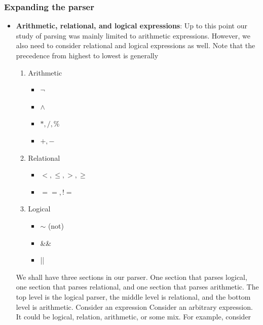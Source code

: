 \documentclass{report}
\begin{document}
    \subsubsection{Expanding the parser}
    \begin{itemize}
        \item \textbf{Arithmetic, relational, and logical expressions}: Up to this point our study of parsing was mainly limited to arithmetic expressions. However, we also need to consider relational and logical expressions as well. 
            \bigbreak \noindent 
            Note that the precedence from highest to lowest is generally
            \begin{enumerate}
                \item Arithmetic
                    \begin{itemize}
                        \item $\neg$
                        \item $\land$
                        \item $*,/,\%$
                        \item $+,-$
                    \end{itemize}
                \item Relational
                    \begin{itemize}
                        \item $<, \leq, >, \geq$
                        \item $==, != $
                    \end{itemize}
                \item Logical
                    \begin{itemize}
                        \item $\sim$ (not)
                        \item \&\& 
                        \item ||
                    \end{itemize}
            \end{enumerate}
            We shall have three sections in our parser. One section that parses logical, one section that parses relational, and one section that parses arithmetic.
            \bigbreak \noindent 
            The top level is the logical parser, the middle level is relational, and the bottom level is arithmetic. Consider an expression
            \bigbreak \noindent 
            Consider an arbitrary expression. It could be logical, relation, arithmetic, or some mix. For example, consider

\end{itemize}
\end{document}
